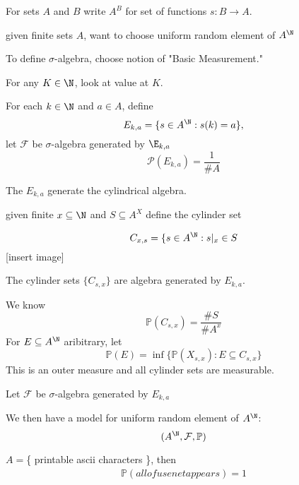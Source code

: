 \begin{definition}
	For sets $A$ and $B$ write $A^B$ for set of functions $s : B \to A$.
\end{definition}

given finite sets $A$, want to choose uniform random element of $A^{\N}$
 

To define $\sigma$-algebra, choose notion of "Basic Measurement."

For any $K \in \N$, look at value at $K.$


For each  $k \in \N$ and $a \in A$, define
\[
	E_{k,a} = \{ s \in A^{\N} : s(k) = a \},
\] 
let $\mathcal{F}$ be $\sigma$-algebra generated by $\E_{k,a}$ 
\[
	\mathcal{P}(E_{k,a}) = \frac{1}{\#A}
\] 

The $E_{k,a}$ generate the cylindrical algebra.


given finite $x \subseteq \N$ and $S \subseteq A^X$ define the cylinder set

\[
	C_{x,s} = \{ s \in A^{\N} : s |_{x} \in S
\] 
[insert image]

The cylinder sets $\{ C_{s,x} \}$ are algebra generated by $E_{k,a}$.

We know 
\[
	\mathbb{P}(C_{s,x} ) = \frac{\#S}{\# A^x}
\] 
For $E \subseteq A^{\N}$ aribitrary, let
 \[
	 \mathbb{P}(E) = \inf \{\mathbb{P}(X_{s,x}) : E \subseteq C_{s,x} \}
\] 
This is an outer measure and all cylinder sets are measurable.

Let $\mathcal{F}$ be $\sigma$-algebra generated by $E_{k,a}$
 
We then have a model for uniform random element of $A^{\N}$:
\[
	(A^{\N}, \mathcal{F}, \mathbb{P})
\] 

\begin{example}

	$A = $\{ printable ascii characters \}, then
	\begin{align*}
		\mathbb{P}(all of usenet appears ) = 1
	\end{align*} 
\end{example}

